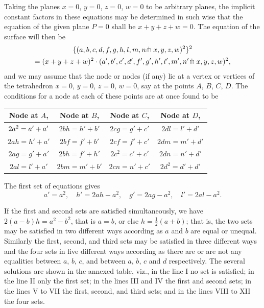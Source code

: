 \documentclass[11pt,a4paper]{article}
\begin{document}
Taking the planes $x=0$, $y=0$, $z=0$, $w=0$ to be arbitrary planes, the implicit constant factors in these equations may be determined in such wise that the equation of the given plane $P=0$ shall be $x + y + z + w = 0$. The equation of the surface will then be
\begin{multline*}
\{(a,b,c,d,f,g,h,l,m,n\hspace{-0.2em}\pitchfork x,y,z,w)^{2}\}^{2}\\
= (x+y+z+w)^{2} \cdot (a',b',c',d',f',g',h',l',m',n'\hspace{-0.2em}\pitchfork x,y,z,w)^{2},
\end{multline*}
and we may assume that the node or nodes (if any) lie at a vertex or vertices of the tetrahedron $x=0$, $y=0$, $z=0$, $w=0$, say at the points $A$, $B$, $C$, $D$. The conditions for a node at each of these points are at once found to be

\begin{center}
\begin{tabular}{c|c|c|c}
Node at $A$, & Node at $B$, & Node at $C$, & Node at $D$,\\\hline
$2a^{2} = a' + a'\vphantom{^{2}}$ & $2bh = h' + b'$ & $2cg = g' + c'$ & $2dl = l' + d'$\\
$2ah = h' + a'$ & $2bf = f' + b'$ & $2cf = f' + c'$ & $2dm = m' + d'$\\
$2ag = g' + a'$ & $2bh = f' + h'$ & $2c^{2} = c' + c'$ & $2dn = n' + d'$\\
$2al = l' + a'$ & $2bm = m' + b'$ & $2cn = n' + c'$ & $2d^{2} = d' + d'$
\end{tabular}
\end{center}

The first set of equations gives
\[
a' = a^{2},\quad h' = 2ah - a^{2},\quad g' = 2ag - a^{2},\quad l' = 2al - a^{2}.
\]

If the first and second sets are satisfied simultaneously, we have $2(a-b)h = a^{2} - b^{2}$, that is $a = b$, or else $h = \frac{1}{2}(a+b)$; that is, the two sets may be satisfied in two different ways according as $a$ and $b$ are equal or unequal. Similarly the first, second, and third sets may be satisfied in three different ways and the four sets in five different ways according as there are or are not any equalities between $a$, $b$, $c$, and between $a$, $b$, $c$ and $d$ respectively. The several solutions are shown in the annexed table, viz., in the line I no set is satisfied; in the line II only the first set; in the lines III and IV the first and second sets; in the lines V to VII the first, second, and third sets; and in the lines VIII to XII the four sets.
\end{document}
